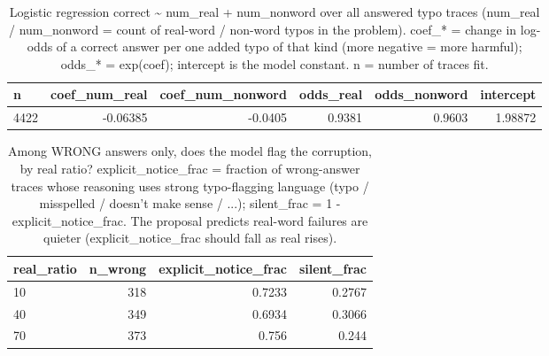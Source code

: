 \documentclass[11pt]{article}
\begin{document}
\begin{table}[H]
\centering
\caption{Logistic regression correct \textasciitilde{} num\_real + num\_nonword over all answered typo traces (num\_real / num\_nonword = count of real-word / non-word typos in the problem). coef\_* = change in log-odds of a correct answer per one added typo of that kind (more negative = more harmful); odds\_* = exp(coef); intercept is the model constant. n = number of traces fit.}
\small
\begin{adjustbox}{max width=\textwidth}
\begin{tabular}{lrrrrr}
\toprule
\textbf{n} & \textbf{coef\_num\_real} & \textbf{coef\_num\_nonword} & \textbf{odds\_real} & \textbf{odds\_nonword} & \textbf{intercept} \\
\midrule
4422 & -0.06385 & -0.0405 & 0.9381 & 0.9603 & 1.98872 \\
\bottomrule
\end{tabular}
\end{adjustbox}
\end{table}

\begin{table}[H]
\centering
\caption{Among WRONG answers only, does the model flag the corruption, by real ratio? explicit\_notice\_frac = fraction of wrong-answer traces whose reasoning uses strong typo-flagging language (typo / misspelled / doesn't make sense / ...); silent\_frac = 1 - explicit\_notice\_frac. The proposal predicts real-word failures are quieter (explicit\_notice\_frac should fall as real rises).}
\small
\begin{adjustbox}{max width=\textwidth}
\begin{tabular}{lrrr}
\toprule
\textbf{real\_ratio} & \textbf{n\_wrong} & \textbf{explicit\_notice\_frac} & \textbf{silent\_frac} \\
\midrule
10 & 318 & 0.7233 & 0.2767 \\
40 & 349 & 0.6934 & 0.3066 \\
70 & 373 & 0.756 & 0.244 \\
\bottomrule
\end{tabular}
\end{adjustbox}
\end{table}
\end{document}
